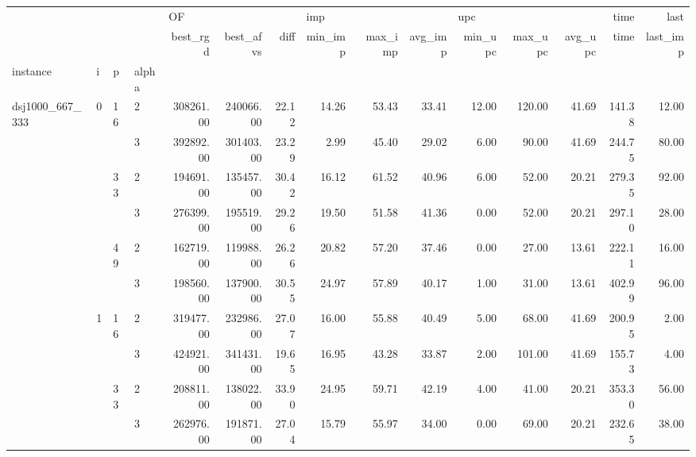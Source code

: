 \begin{tabular}{llllrrrrrrrrrrr}
\toprule
                &   &    &   & \multicolumn{3}{l}{OF} & \multicolumn{3}{l}{imp} & \multicolumn{3}{l}{upc} &   time &     last \\
                &   &    &   &  best\_rgd & best\_afvs &  diff & min\_imp & max\_imp & avg\_imp & min\_upc & max\_upc & avg\_upc &   time & last\_imp \\
instance & i & p & alpha &           &           &       &         &         &         &         &         &         &        &          \\
\midrule
\multirow{60}{*}{dsj1000\_667\_333} & \multirow{6}{*}{0} & \multirow{2}{*}{16} & 2 & 308261.00 & 240066.00 & 22.12 &   14.26 &   53.43 &   33.41 &   12.00 &  120.00 &   41.69 & 141.38 &    12.00 \\
                &   &    & 3 & 392892.00 & 301403.00 & 23.29 &    2.99 &   45.40 &   29.02 &    6.00 &   90.00 &   41.69 & 244.75 &    80.00 \\
\cline{3-15}
                &   & \multirow{2}{*}{33} & 2 & 194691.00 & 135457.00 & 30.42 &   16.12 &   61.52 &   40.96 &    6.00 &   52.00 &   20.21 & 279.35 &    92.00 \\
                &   &    & 3 & 276399.00 & 195519.00 & 29.26 &   19.50 &   51.58 &   41.36 &    0.00 &   52.00 &   20.21 & 297.10 &    28.00 \\
\cline{3-15}
                &   & \multirow{2}{*}{49} & 2 & 162719.00 & 119988.00 & 26.26 &   20.82 &   57.20 &   37.46 &    0.00 &   27.00 &   13.61 & 222.11 &    16.00 \\
                &   &    & 3 & 198560.00 & 137900.00 & 30.55 &   24.97 &   57.89 &   40.17 &    1.00 &   31.00 &   13.61 & 402.99 &    96.00 \\
\cline{2-15}
\cline{3-15}
                & \multirow{6}{*}{1} & \multirow{2}{*}{16} & 2 & 319477.00 & 232986.00 & 27.07 &   16.00 &   55.88 &   40.49 &    5.00 &   68.00 &   41.69 & 200.95 &     2.00 \\
                &   &    & 3 & 424921.00 & 341431.00 & 19.65 &   16.95 &   43.28 &   33.87 &    2.00 &  101.00 &   41.69 & 155.73 &     4.00 \\
\cline{3-15}
                &   & \multirow{2}{*}{33} & 2 & 208811.00 & 138022.00 & 33.90 &   24.95 &   59.71 &   42.19 &    4.00 &   41.00 &   20.21 & 353.30 &    56.00 \\
                &   &    & 3 & 262976.00 & 191871.00 & 27.04 &   15.79 &   55.97 &   34.00 &    0.00 &   69.00 &   20.21 & 232.65 &    38.00 \\

\end{tabular}
